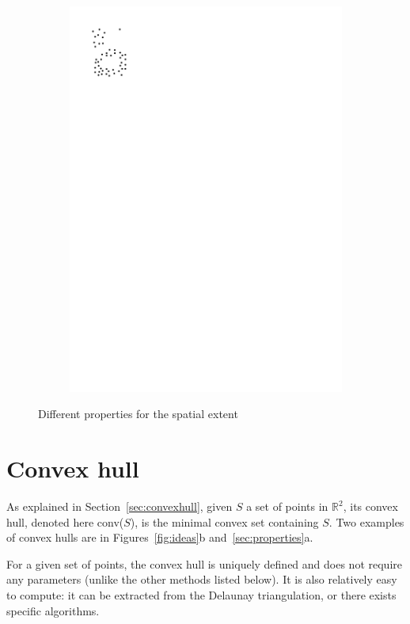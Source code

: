 \begin{figure}
\begin{subfigure}[b]{0.15\linewidth}
    \includegraphics[page=3,width=\textwidth]{figs/properties.pdf}
    \caption{}
  \end{subfigure}
\caption{Different properties for the spatial extent}
\label{fig:properties}  
\end{figure}


%
\section{Convex hull}

As explained in Section~\ref{sec:convexhull}, given $S$ a set of points in $\mathbb{R}^2$, its convex hull, denoted here conv($S$), is the minimal convex set containing $S$.
Two examples of convex hulls are in Figures~\ref{fig:ideas}b and~\ref{sec:properties}a.

%

For a given set of points, the convex hull is uniquely defined and does not require any parameters (unlike the other methods listed below).
It is also relatively easy to compute: it can be extracted from the Delaunay triangulation, or there exists specific algorithms.

